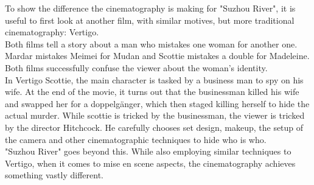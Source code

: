 \documentclass[fleqn,14pt]{article}
\begin{document}
To show the difference the cinematography is making for "Suzhou River", it is useful to first look
at another film, with similar motives, but more traditional cinematography: Vertigo.\\
Both films tell a story about a man who mistakes one woman for another one.
Mardar mistakes Meimei for Mudan and Scottie mistakes a double for Madeleine.
Both films successfully confuse the viewer about the woman's identity. \\
In Vertigo Scottie, the main character is tasked by a business
man to spy on his wife. At the end of the movie, it turns out that the businessman killed his wife
and swapped her for a doppelgänger, which then staged killing herself to hide the actual murder. 
While scottie is tricked by the businessman, the viewer is tricked by the director Hitchcock. He
carefully chooses set design, makeup, the setup of the camera and other cinematographic techniques
to hide who is who.\\
"Suzhou River" goes beyond this. While also employing similar techniques to Vertigo, when it comes to
mise en scene aspects, the cinematography achieves something vastly different.\\
\end{document}
